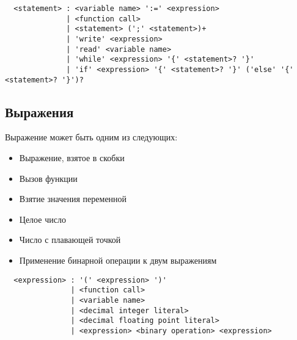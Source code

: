 \documentclass{amsart}
\begin{document}
  \begin{lstlisting}
  <statement> : <variable name> ':=' <expression> 
              | <function call>
              | <statement> (';' <statement>)+
              | 'write' <expression>
              | 'read' <variable name>
              | 'while' <expression> '{' <statement>? '}'
              | 'if' <expression> '{' <statement>? '}' ('else' '{' <statement>? '}')?
  \end{lstlisting}

  \subsection{Выражения}
  Выражение может быть одним из следующих:

  \begin{itemize}
      \item Выражение, взятое в скобки
      \item Вызов функции
      \item Взятие значения переменной
      \item Целое число
      \item Число с плавающей точкой
      \item Применение бинарной операции к двум выражениям
  \end{itemize}

  \begin{lstlisting}
  <expression> : '(' <expression> ')'
               | <function call>
               | <variable name> 
               | <decimal integer literal>
               | <decimal floating point literal>
               | <expression> <binary operation> <expression>
  \end{lstlisting}
\end{document}
